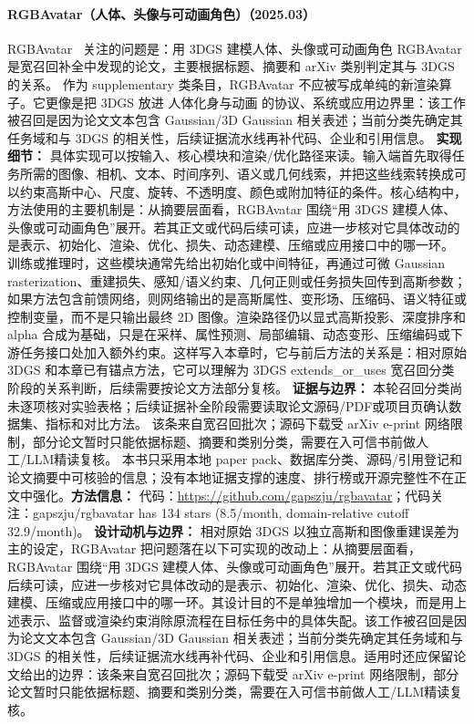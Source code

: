 \paragraph{RGBAvatar（人体、头像与可动画角色）（2025.03）}
RGBAvatar~\cite{2503_12886} 关注的问题是：用 3DGS 建模人体、头像或可动画角色 RGBAvatar 是宽召回补全中发现的论文，主要根据标题、摘要和 arXiv 类别判定其与 3DGS 的关系。
作为 supplementary 类条目，RGBAvatar 不应被写成单纯的新渲染算子。它更像是把 3DGS 放进 人体化身与动画 的协议、系统或应用边界里：该工作被召回是因为论文文本包含 Gaussian/3D Gaussian 相关表述；当前分类先确定其任务域和与 3DGS 的相关性，后续证据流水线再补代码、企业和引用信息。
\textbf{实现细节：} 具体实现可以按输入、核心模块和渲染/优化路径来读。输入端首先取得任务所需的图像、相机、文本、时间序列、语义或几何线索，并把这些线索转换成可以约束高斯中心、尺度、旋转、不透明度、颜色或附加特征的条件。核心结构中，方法使用的主要机制是：从摘要层面看，RGBAvatar 围绕“用 3DGS 建模人体、头像或可动画角色”展开。若其正文或代码后续可读，应进一步核对它具体改动的是表示、初始化、渲染、优化、损失、动态建模、压缩或应用接口中的哪一环。 训练或推理时，这些模块通常先给出初始化或中间特征，再通过可微 Gaussian rasterization、重建损失、感知/语义约束、几何正则或任务损失回传到高斯参数；如果方法包含前馈网络，则网络输出的是高斯属性、变形场、压缩码、语义特征或控制变量，而不是只输出最终 2D 图像。渲染路径仍以显式高斯投影、深度排序和 alpha 合成为基础，只是在采样、属性预测、局部编辑、动态变形、压缩编码或下游任务接口处加入额外约束。这样写入本章时，它与前后方法的关系是：相对原始 3DGS 和本章已有锚点方法，它可以理解为 3DGS extends\_or\_uses 宽召回分类阶段的关系判断，后续需要按论文方法部分复核。
\textbf{证据与边界：} 本轮召回分类尚未逐项核对实验表格；后续证据补全阶段需要读取论文源码/PDF或项目页确认数据集、指标和对比方法。 该条来自宽召回批次；源码下载受 arXiv e-print 网络限制，部分论文暂时只能依据标题、摘要和类别分类，需要在入可信书前做人工/LLM精读复核。 本书只采用本地 paper pack、数据库分类、源码/引用登记和论文摘要中可核验的信息；没有本地证据支撑的速度、排行榜或开源完整性不在正文中强化。\textbf{方法信息：} 代码：\url{https://github.com/gapszju/rgbavatar}；代码关注：gapszju/rgbavatar has 134 stars (8.5/month, domain-relative cutoff 32.9/month)。
\textbf{设计动机与边界：} 相对原始 3DGS 以独立高斯和图像重建误差为主的设定，RGBAvatar 把问题落在以下可实现的改动上：从摘要层面看，RGBAvatar 围绕“用 3DGS 建模人体、头像或可动画角色”展开。若其正文或代码后续可读，应进一步核对它具体改动的是表示、初始化、渲染、优化、损失、动态建模、压缩或应用接口中的哪一环。其设计目的不是单独增加一个模块，而是用上述表示、监督或渲染约束消除原流程在目标任务中的具体失配。该工作被召回是因为论文文本包含 Gaussian/3D Gaussian 相关表述；当前分类先确定其任务域和与 3DGS 的相关性，后续证据流水线再补代码、企业和引用信息。适用时还应保留论文给出的边界：该条来自宽召回批次；源码下载受 arXiv e-print 网络限制，部分论文暂时只能依据标题、摘要和类别分类，需要在入可信书前做人工/LLM精读复核。
